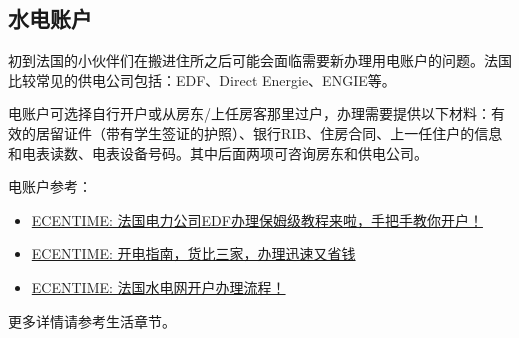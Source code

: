 \subsection{水电账户}

初到法国的小伙伴们在搬进住所之后可能会面临需要新办理用电账户的问题。法国比较常见的供电公司包括：EDF、Direct Energie、ENGIE等。

电账户可选择自行开户或从房东/上任房客那里过户，办理需要提供以下材料：有效的居留证件（带有学生签证的护照）、银行RIB、住房合同、上一任住户的信息和电表读数、电表设备号码。其中后面两项可咨询房东和供电公司。

电账户参考：
\begin{itemize}
    \item \href{https://www.ecentime.com/article/edf}{ECENTIME: 法国电力公司EDF办理保姆级教程来啦，手把手教你开户！}
    \item \href{https://www.ecentime.com/article/guide-electricite-comparaison-prix-bas}{ECENTIME: 开电指南，货比三家，办理迅速又省钱}
    \item \href{https://www.ecentime.com/article/edf-box-internet}{ECENTIME: 法国水电网开户办理流程！}
\end{itemize}

更多详情请参考生活章节。
